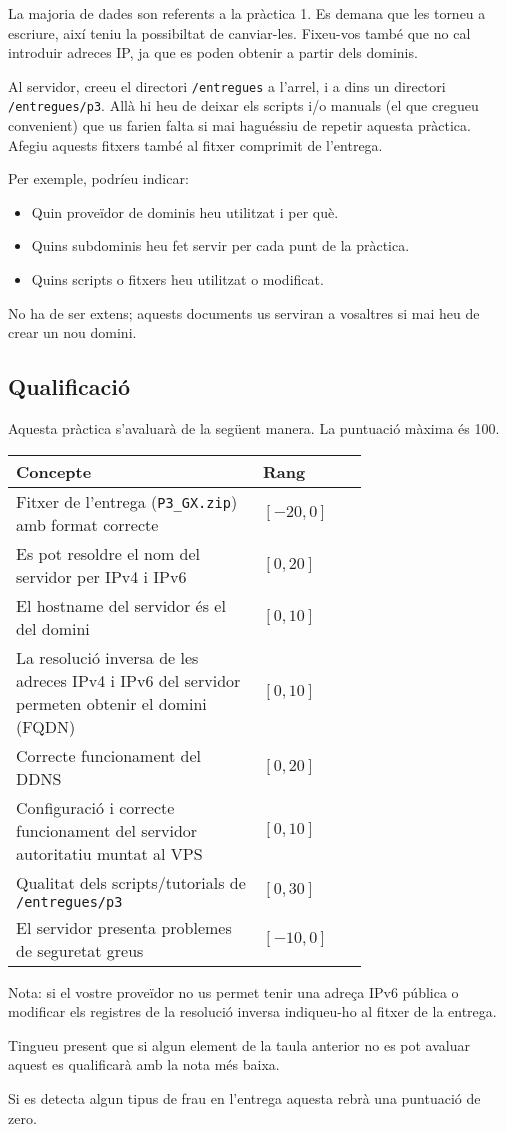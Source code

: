 \documentclass{practicaitic}
\begin{document}
La majoria de dades son referents a la pràctica 1. Es demana
que les torneu a escriure, així teniu la possibiltat de canviar-les.
Fixeu-vos també que no cal introduir adreces IP, ja que es poden
obtenir a partir dels dominis.

Al servidor, creeu el directori \texttt{/entregues} a l'arrel, i a dins un
directori \texttt{/entregues/p3}. Allà hi heu de deixar els scripts i/o manuals
(el que cregueu convenient) que us farien falta si mai haguéssiu de repetir
aquesta pràctica. Afegiu aquests fitxers també al fitxer comprimit de l'entrega.

Per exemple, podríeu indicar:
\begin{itemize}
  \item Quin proveïdor de dominis heu utilitzat i per què.
  \item Quins subdominis heu fet servir per cada punt de la pràctica.
  \item Quins scripts o fitxers heu utilitzat o modificat.
\end{itemize}

No ha de ser extens; aquests documents us serviran a vosaltres si mai heu de
crear un nou domini.

\subsection{Qualificació}

Aquesta pràctica s'avaluarà de la següent manera. La puntuació màxima és 100.

\begin{center}%
  \begin{tabular}{p{0.7\linewidth} l}
  \hline
  Concepte & Rang \\ \hline
  Fitxer de l'entrega (\texttt{P3\_GX.zip}) amb format correcte & $[-20, 0]$ \\
  Es pot resoldre el nom del servidor per IPv4 i IPv6 & $[0, 20]$ \\
  El hostname del servidor és el del domini & $[0, 10]$ \\
  La resolució inversa de les adreces IPv4 i IPv6 del servidor permeten obtenir el domini (FQDN) & $[0, 10]$ \\
  Correcte funcionament del DDNS & $[0, 20]$ \\
  Configuració i correcte funcionament del servidor autoritatiu muntat al VPS & $[0, 10]$ \\
  Qualitat dels scripts/tutorials de \texttt{/entregues/p3} & $[0,30]$ \\
  El servidor presenta problemes de seguretat greus & $[-10,0]$ \\
  \hline
  \end{tabular}
\end{center}

Nota: si el vostre proveïdor no us permet tenir una adreça IPv6 pública o
modificar els registres de la resolució inversa indiqueu-ho al fitxer de la
entrega.

Tingueu present que si algun element de la taula anterior no es pot avaluar
aquest es qualificarà amb la nota més baixa.

Si es detecta algun tipus de frau en l'entrega aquesta rebrà una puntuació de zero.
\end{document}
